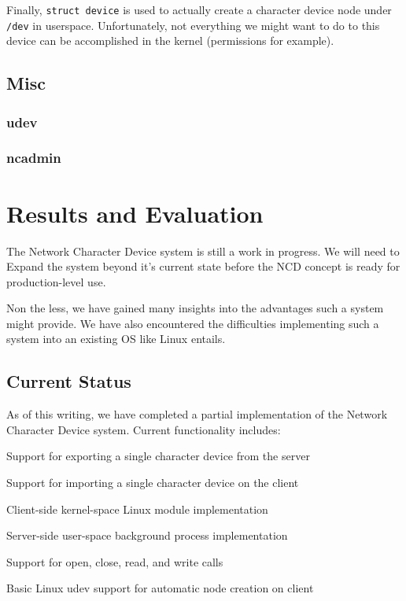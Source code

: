 \documentclass[11pt,twocolumn]{article}
\newenvironment{packed_item}{
\begin{itemize}
  \setlength{\itemsep}{1pt}
  \setlength{\parskip}{0pt}
  \setlength{\parsep}{0pt}
}{\end{itemize}}
\begin{document}
Finally, \texttt{struct device} is used to actually create a character
device node under \texttt{/dev} in userspace. Unfortunately, not
everything we might want to do to this device can be accomplished in the
kernel (permissions for example).

\subsection{Misc}

\subsubsection{udev}
\label{subsec:udev}

\subsubsection{ncadmin}


\section{Results and Evaluation}
\label{sec:results}

The Network Character Device system is still a work in
progress. We will need to Expand the system beyond it's current state
before the NCD concept is ready for production-level use.

Non the less, we have gained many insights into the advantages such a
system might provide. We have also encountered the difficulties
implementing such a system into an existing OS like Linux entails.

\subsection{Current Status}
\label{sec:currentstatus}

As of this writing, we have completed a partial implementation of
the Network Character Device system. Current functionality includes:

\begin{packed_item}
\item Support for exporting a single character device from the server
\item Support for importing a single character device on the client
\item Client-side kernel-space Linux module implementation
\item Server-side user-space background process implementation
\item Support for open, close, read, and write calls
\item Basic Linux udev support for automatic node creation on client
\end{packed_item}
\end{document}
